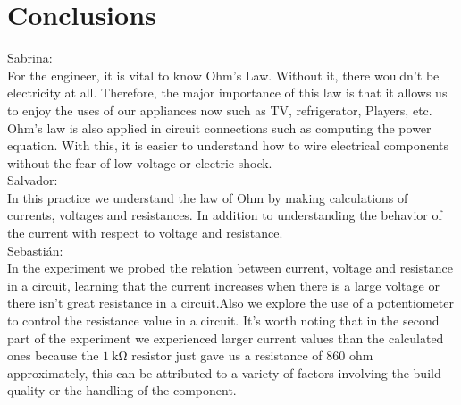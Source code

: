 \documentclass[a4paper]{article}
\begin{document}
\section{Conclusions}
{\large Sabrina:}\\
For the engineer, it is vital to know Ohm's Law. Without it, there wouldn't be electricity at all. Therefore, the major importance of this law is that it allows us to enjoy the uses of our appliances now such as TV, refrigerator, Players, etc.
Ohm's law is also applied in circuit connections such as computing the power equation. With this, it
is easier to understand how to wire electrical components without the fear of low voltage or
electric shock.\\[2ex]
{\large Salvador:}\\
In this practice we understand the law of Ohm by making calculations of currents, voltages and resistances. In addition to understanding the behavior of the current with respect to voltage and resistance.\\[2ex]
{\large Sebastián:}\\
In the experiment we probed the relation between current, voltage and resistance in a circuit, learning that the current increases when there is a large voltage or there isn't great resistance in a circuit.Also we explore the use of a potentiometer to control the resistance value in a circuit. It's worth noting that in the second part of the experiment we experienced larger current values than the calculated ones because the $\SI{1}{\kilo\ohm}$ resistor just gave us a resistance of 860 ohm approximately, this can be attributed to a variety of factors involving the build quality or the handling of the component.
\end{document}
